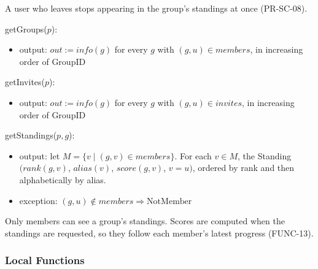 \documentclass[12pt, titlepage]{article}
\begin{document}
\noindent A user who leaves stops appearing in the group's standings at once
(PR-SC-08).

\medskip

\noindent getGroups($p$):
\begin{itemize}
\item output: $\mathit{out} := \mathit{info}(g)$ for every $g$ with $(g, u)
  \in \mathit{members}$, in increasing order of GroupID
\end{itemize}

\noindent getInvites($p$):
\begin{itemize}
\item output: $\mathit{out} := \mathit{info}(g)$ for every $g$ with $(g, u)
  \in \mathit{invites}$, in increasing order of GroupID
\end{itemize}

\noindent getStandings($p, g$):
\begin{itemize}
\item output: let $M = \{v \mid (g, v) \in \mathit{members}\}$. For each $v
  \in M$, the Standing $(\mathit{rank}(g, v)$, $\mathit{alias}(v)$,
  $\mathit{score}(g, v)$, $v = u)$, ordered by rank and then alphabetically by alias.
\item exception: $(g, u) \notin \mathit{members} \Rightarrow
  \mathrm{NotMember}$
\end{itemize}

\noindent Only members can see a group's standings. Scores are computed when
the standings are requested, so they follow each member's latest progress
(FUNC-13).

\subsubsection{Local Functions}
\end{document}
